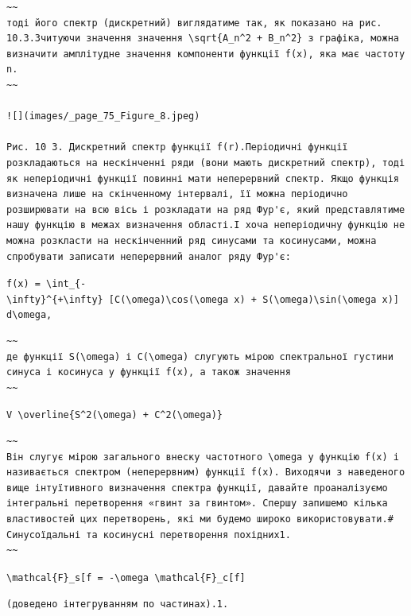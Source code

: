 \documentclass[
  ukrainian,
]{article}
\begin{document}
\begin{verbatim}
~~
тоді його спектр (дискретний) виглядатиме так, як показано на рис. 10.3.Зчитуючи значення значення \sqrt{A_n^2 + B_n^2} з графіка, можна визначити амплітудне значення компоненти функції f(x), яка має частоту n.
~~

![](images/_page_75_Figure_8.jpeg)

Рис. 10 3. Дискретний спектр функції f(r).Періодичні функції розкладаються на нескінченні ряди (вони мають дискретний спектр), тоді як неперіодичні функції повинні мати неперервний спектр. Якщо функція визначена лише на скінченному інтервалі, її можна періодично розширювати на всю вісь і розкладати на ряд Фур'є, який представлятиме нашу функцію в межах визначення області.І хоча неперіодичну функцію не можна розкласти на нескінченний ряд синусами та косинусами, можна спробувати записати неперервний аналог ряду Фур'є:
\end{verbatim}

\texttt{f(x)\ =\ \textbackslash{}int\_\{-\textbackslash{}infty\}\^{}\{+\textbackslash{}infty\}\ {[}C(\textbackslash{}omega)\textbackslash{}cos(\textbackslash{}omega\ x)\ +\ S(\textbackslash{}omega)\textbackslash{}sin(\textbackslash{}omega\ x){]}\ d\textbackslash{}omega,}

\begin{verbatim}
~~
де функції S(\omega) і C(\omega) слугують мірою спектральної густини синуса і косинуса у функції f(x), а також значення
~~
\end{verbatim}

\texttt{V\ \textbackslash{}overline\{S\^{}2(\textbackslash{}omega)\ +\ C\^{}2(\textbackslash{}omega)\}}

\begin{verbatim}
~~
Він слугує мірою загального внеску частотного \omega у функцію f(x) і називається спектром (неперервним) функції f(x). Виходячи з наведеного вище інтуїтивного визначення спектра функції, давайте проаналізуємо інтегральні перетворення «гвинт за гвинтом». Спершу запишемо кілька властивостей цих перетворень, які ми будемо широко використовувати.# Синусоїдальні та косинусні перетворення похідних1.
~~
\end{verbatim}

\texttt{\textbackslash{}mathcal\{F\}\_s{[}f\textquotesingle{}{]}\ =\ -\textbackslash{}omega\ \textbackslash{}mathcal\{F\}\_c{[}f{]}}

\begin{verbatim}
(доведено інтегруванням по частинах).1.
\end{verbatim}
\end{document}
